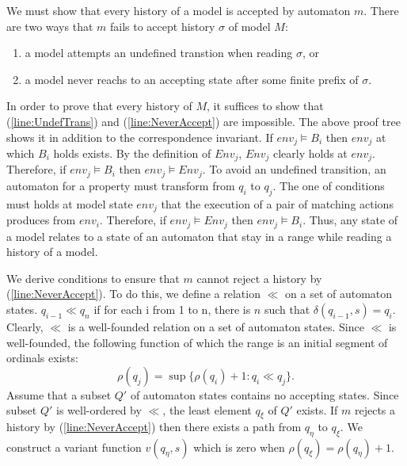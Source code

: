 \documentclass[12pt,a4paper,titlepage]{article}
\theoremstyle{break}
\begin{document}
We must show that every history of a model is accepted by automaton $m$.
There are two ways that $m$ fails to accept history \(\sigma\) of model \(M\):
  \begin{enumerate}
\renewcommand{\theenumi}{\roman{enumi}}
\renewcommand{\labelenumi}{(\roman{enumi})}
\item a model attempts an undefined transtion when reading \(\sigma\), or \label{line:UndefTrans}
\item a model never reachs to an accepting state after some finite prefix of \(\sigma\). \label{line:NeverAccept}
  \end{enumerate}
In order to prove that every history of \(M\), it suffices to show that (\ref{line:UndefTrans}) and (\ref{line:NeverAccept}) are impossible.
The above proof tree shows it in addition to the correspondence invariant.
If \(env_j\models B_i\) then \(env_j\) at which \(B_i\) holds exists.
By the definition of \(Env_j\), \(Env_j\) clearly holds at \(env_j\).
Therefore, if \(env_j\models B_i\) then \(env_j\models Env_j\).
To avoid an undefined transition, an automaton for a property must transform from \(q_i\) to \(q_j\).
The one of conditions must holds at model state \(env_j\) that the execution of a pair of matching actions produces from \(env_i\).
Therefore, if \(env_j\models Env_j\) then \(env_j\models B_i\).
Thus, any state of a model relates to a state of an automaton that stay in a range while reading a history of a model.

We derive conditions to ensure that $m$ cannot reject a history by (\ref{line:NeverAccept}).
To do this, we define a relation $\ll$ on a set of automaton states.
\(q_{i-1}\ll q_n\) if for each i from 1 to n, there is $n$ such that \(\delta(q_{i-1},s)=q_{i}\).
Clearly, \(\ll\) is a well-founded relation on a set of automaton states.
Since \(\ll\) is well-founded, the following function of which the range is an initial segment of ordinals exists:
  \begin{displaymath}
\rho(q_j)=\sup\{\rho(q_i)+1\colon q_i\ll q_j\}.
  \end{displaymath}
Assume that a subset \(Q'\) of automaton states contains no accepting states.
Since subset \(Q'\) is well-ordered by \(\ll\), the least element \(q{_\xi}\) of \(Q'\) exists.
If $m$ rejects a history by (\ref{line:NeverAccept}) then there exists a path from \(q_{\eta}\) to \(q_{\xi}\).
We construct a variant function \(v(q_{\eta},s)\) which is zero when \(\rho(q_{\xi})=\rho(q_{\eta})+1\).
\end{document}

